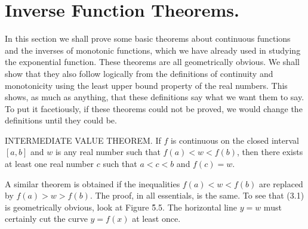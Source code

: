 \section{Inverse Function Theorems.}\label{sec 5.3}  
In this section we shall prove some basic theorems about
continuous functions and the inverses of monotonic functions, which we have already used in studying the exponential function. These theorems are all geometrically obvious. We shall show that they also follow
logically from the definitions of continuity and monotonicity using the least upper bound property of the real numbers. This shows, as much as anything, that these definitions say what we want them to say. To put it facetiously, if these theorems could not be proved, we would
change the definitions until they could be.


\begin{theorem} INTERMEDIATE VALUE THEOREM. %
\label{thm 5.3.1}
If $f$ is continuous on the closed interval $[a, b]$ and $w$ is
any real number such that $f (a) < w < f (b)$, then there exists at least one real number $c$ such that $a < c < b$ and $f(c) = w$.
\end{theorem}

A similar theorem is obtained if the inequalities $f(a) < w < f(b)$ are replaced by $f(a) > w > f (b)$. The proof, in all essentials, is the same. To see that (3.1) is geometrically obvious, look at Figure \f{5.5}. The horizontal line $y = w$ must certainly cut the curve $y = f (x)$ at least once.


